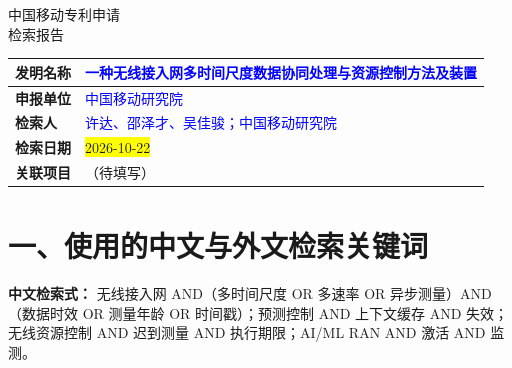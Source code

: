 \documentclass[12pt,a4paper]{article}
\begin{document}
\noindent

\vspace{1em}

\begin{center}
    {\Huge\heiti 中国移动专利申请} \\[0.5em]
    {\Huge\heiti 检索报告} \\[1em]
\end{center}

\begin{table}[h]
    \centering
    \renewcommand{\arraystretch}{2}
    \begin{tabular}{|p{3cm}|p{12cm}|}
        \hline
        \textbf{发明名称} & \textcolor{blue}{一种无线接入网多时间尺度数据协同处理与资源控制方法及装置} \\
        \hline
        \textbf{申报单位} & \textcolor{blue}{中国移动研究院} \\
        \hline
        \textbf{检索人} & \textcolor{blue}{许达、邵泽才、吴佳骏；中国移动研究院} \\
        \hline
        \textbf{检索日期} & \colorbox{yellow}{2026-10-22} \\
        \hline
        \textbf{关联项目} & （待填写） \\
        \hline
    \end{tabular}
\end{table}

\vspace{0.5em}

\noindent{}

\vspace{1em}


\section*{一、使用的中文与外文检索关键词}

\textbf{中文检索式：}
无线接入网 AND（多时间尺度 OR 多速率 OR 异步测量）AND（数据时效 OR 测量年龄 OR 时间戳）；预测控制 AND 上下文缓存 AND 失效；无线资源控制 AND 迟到测量 AND 执行期限；AI/ML RAN AND 激活 AND 监测。
\end{document}
